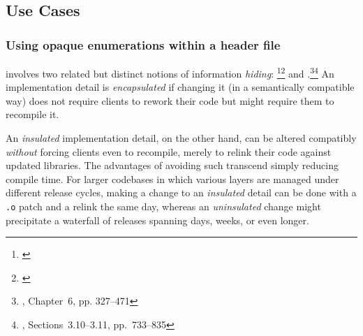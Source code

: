 %
%
%
%
%

\subsection[Use Cases]{Use Cases}\label{use-cases-opaqueenum}

\subsubsection[Using opaque enumerations within a header file]{Using opaque enumerations within a header file}\label{using-opaque-enumerations-within-a-header-file}

 involves two related but distinct notions of
information \emph{hiding}: \footnote{\cite{liskov87}}\footnote{\cite{liskov16}} and .\footnote{\cite{lakos96}, Chapter~6, pp. 327--471}\footnote{\cite{lakos20}, Sections~3.10--3.11, pp.~733--835}
An implementation detail is \emph{encapsulated} if changing it (in a
semantically compatible way) does not require clients to rework their
code but might require them to recompile it.

An \emph{insulated} implementation detail, on the other hand, can be
altered compatibly \emph{without} forcing clients even to recompile, merely to relink their code against updated libraries.
The advantages of avoiding such  transcend
simply reducing compile time. For larger codebases in which various
layers are managed under different release cycles, making a change to an
\emph{insulated} detail can be done with a \lstinline!.o! patch and a
relink the same day, whereas an \emph{uninsulated} change might
precipitate a waterfall of releases spanning days, weeks, or even
longer.

